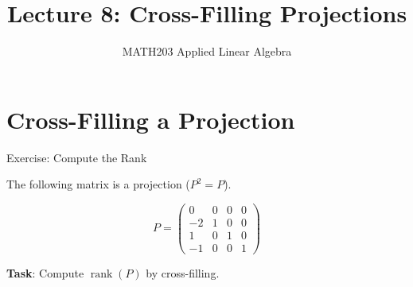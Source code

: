 \documentclass[10pt]{beamer}
\title{Lecture 8: Cross-Filling Projections}
\subtitle{MATH203 Applied Linear Algebra}
\date{}
\theoremstyle{definition}
\newcommand{\x}[1]{\alert{\textbf{#1}}}
\begin{document}
\maketitle

%
%
\section{Cross-Filling a Projection}

\begin{frame}{Exercise: Compute the Rank}

The following matrix is a projection ($P^2 = P$).

\vspace{0.3em}

$$P = \begin{pmatrix} 0 & 0 & 0 & 0 \\ -2 & 1 & 0 & 0 \\ 1 & 0 & 1 & 0 \\ -1 & 0 & 0 & 1 \end{pmatrix}$$

\vspace{0.3em}

\x{Task}: Compute $\operatorname{rank}(P)$ by cross-filling.

\end{frame}
\end{document}
